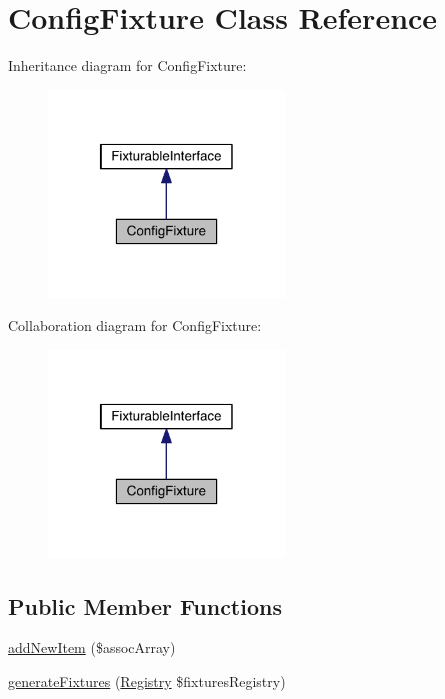 \hypertarget{class_entity_1_1_config_fixture}{\section{Config\-Fixture Class Reference}
\label{class_entity_1_1_config_fixture}
}


Inheritance diagram for Config\-Fixture\-:
\nopagebreak
\begin{figure}[H]
\begin{center}
\leavevmode
\includegraphics[width=178pt]{class_entity_1_1_config_fixture__inherit__graph}
\end{center}
\end{figure}


Collaboration diagram for Config\-Fixture\-:
\nopagebreak
\begin{figure}[H]
\begin{center}
\leavevmode
\includegraphics[width=178pt]{class_entity_1_1_config_fixture__coll__graph}
\end{center}
\end{figure}
\subsection*{Public Member Functions}
\begin{DoxyCompactItemize}
\item 
\hyperlink{class_entity_1_1_config_fixture_a4ff07981a68955867c222fc0712e323a}{add\-New\-Item} (\$assoc\-Array)
\item 
\hyperlink{class_entity_1_1_config_fixture_a60af9abed72c391727622c642cc4c612}{generate\-Fixtures} (\hyperlink{classapp_1_1models_1_1core_1_1_registry}{Registry} \$fixtures\-Registry)
\end{DoxyCompactItemize}

